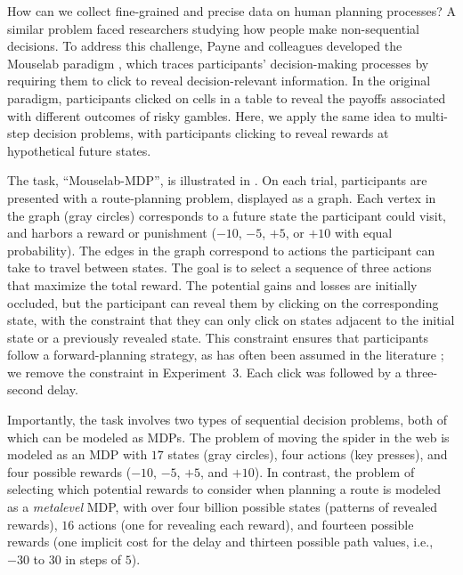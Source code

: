 How can we collect fine-grained and precise data on human planning processes? A similar problem faced researchers studying how people make non-sequential decisions. To address this challenge, Payne and colleagues developed the Mouselab paradigm \citep{payne1976task,payne1988adaptive}, which traces participants' decision-making processes by requiring them to click to reveal decision-relevant information. In the original paradigm, participants clicked on cells in a table to reveal the payoffs associated with different outcomes of risky gambles. Here, we apply the same idea to multi-step decision problems, with participants clicking to reveal rewards at hypothetical future states.


The task, ``Mouselab-MDP'', is illustrated in . On each trial, participants are presented with a route-planning problem, displayed as a graph. Each vertex in the graph (gray circles) corresponds to a future state the participant could visit, and harbors a reward or punishment ($-10$, $-5$, $+5$, or $+10$ with equal probability). The edges in the graph correspond to actions the participant can take to travel between states. The goal is to select a sequence of three actions that maximize the total reward. The potential gains and losses are initially occluded, but the participant can reveal them by clicking on the corresponding state, with the constraint that they can only click on states adjacent to the initial state or a previously revealed state. This constraint ensures that participants follow a forward-planning strategy, as has often been assumed in the literature \citep{huys2015interplay,huys2012bonsai,vanopheusden2017computational,macgregor2001information,keramati2016adaptive,krusche2018adaptive,snider2015prospective}; we remove the constraint in Experiment~3. Each click was followed by a three-second delay.

Importantly, the task involves two types of sequential decision problems, both of which can be modeled as MDPs. The problem of moving the spider in the web is modeled as an MDP with $17$ states (gray circles), four actions (key presses), and four possible rewards ($-10$, $-5$, $+5$, and $+10$). In contrast, the problem of selecting which potential rewards to consider when planning a route is modeled as a \emph{metalevel} MDP, with over four billion possible states (patterns of revealed rewards), $16$ actions (one for revealing each reward), and fourteen possible rewards (one implicit cost for the delay and thirteen possible path values, i.e., $-30$ to $30$ in steps of $5$).

